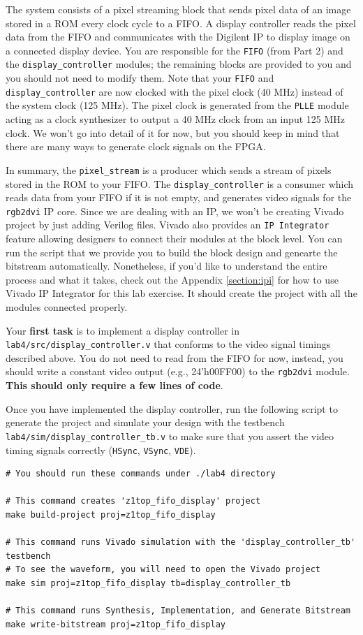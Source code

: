 \documentclass[11pt]{article}
\begin{document}
The system consists of a pixel streaming block that sends pixel data of an image stored in a ROM every clock cycle to a FIFO. A display controller reads the pixel data from the FIFO and communicates with the Digilent IP to display image on a connected display device. You are responsible for the \verb|FIFO| (from Part 2) and the \verb|display_controller| modules; the remaining blocks are provided to you and you should not need to modify them. Note that your \verb|FIFO| and \verb|display_controller| are now clocked with the pixel clock (40 MHz) instead of the system clock (125 MHz). The pixel clock is generated from the \verb|PLLE| module acting as a clock synthesizer to output a 40 MHz clock from an input 125 MHz clock. We won't go into detail of it for now, but you should keep in mind that there are many ways to generate clock signals on the FPGA.

In summary, the \verb|pixel_stream| is a producer which sends a stream of pixels stored in the ROM to your FIFO. The \verb|display_controller| is a consumer which reads data from your FIFO if it is not empty, and generates video signals for the \verb|rgb2dvi| IP core. Since we are dealing with an IP, we won't be creating Vivado project by just adding Verilog files. Vivado also provides an \texttt{IP Integrator} feature allowing designers to connect their modules at the block level. You can run the script that we provide you to build the block design and genearte the bitstream automatically. Nonetheless, if you'd like to understand the entire process and what it takes, check out the Appendix \ref{section:ipi} for how to use Vivado IP Integrator for this lab exercise. It should create the project with all the modules connected properly.

Your \textbf{first task} is to implement a display controller in \verb|lab4/src/display_controller.v| that conforms to the video signal timings described above. You do not need to read from the FIFO for now, instead, you should write a constant video output (e.g., 24'h00FF00) to the \verb|rgb2dvi| module. \textbf{This should only require a few lines of code}.

Once you have implemented the display controller, run the following script to generate the project and simulate your design with the testbench \verb|lab4/sim/display_controller_tb.v| to make sure that you assert the video timing signals correctly (\verb|HSync|, \verb|VSync|, \verb|VDE|).

\begin{verbatim}
# You should run these commands under ./lab4 directory

# This command creates 'z1top_fifo_display' project
make build-project proj=z1top_fifo_display

# This command runs Vivado simulation with the 'display_controller_tb' testbench
# To see the waveform, you will need to open the Vivado project
make sim proj=z1top_fifo_display tb=display_controller_tb

# This command runs Synthesis, Implementation, and Generate Bitstream
make write-bitstream proj=z1top_fifo_display
\end{verbatim}
\end{document}
